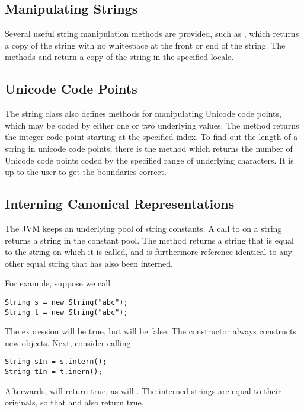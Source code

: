 \subsection{Manipulating Strings}

Several useful string manipulation methods are provided, such as
, which returns a copy of the string with no whitespace
at the front or end of the string.  The methods
 and  return a
copy of the string in the specified locale.

\subsection{Unicode Code Points}

The string class also defines methods for manipulating Unicode
code points, which may be coded by either one or two underlying
 values.  The method  returns
the integer code point starting at the specified index.  To find out
the length of a string in unicode code points, there is the method
 which returns the number of Unicode
code points coded by the specified range of underlying characters.  It
is up to the user to get the boundaries correct.

\subsection{Interning Canonical Representations}\label{section:string-intern}

The JVM keeps an underlying pool of string constants.  A call to
 on a string returns a string in the constant pool.
The method  returns a string that is equal to the
string on which it is called, and is furthermore reference identical
to any other equal string that has also been interned.

For example,  suppose we call
%
\begin{verbatim}
String s = new String("abc");   
String t = new String("abc");   
\end{verbatim}
%
The expression  will be true, but
 will be false.  The constructor  always
constructs new objects.  Next, consider calling
%
\begin{verbatim}
String sIn = s.intern();  
String tIn = t.inern();
\end{verbatim}
%
Afterwards,  will return true, as will
.  The interned strings are equal to their
originals, so that  and  also
return true.



